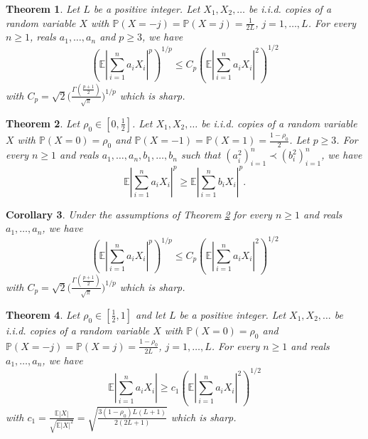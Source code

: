 \documentclass[10pt]{article}
\newcommand{\E}{\mathbb{E}}
\newcommand{\1}{\textbf{1}}
\newcommand{\p}[1]{\mathbb{P}\left( #1 \right)}
\newtheorem{theorem}{Theorem}
\newtheorem{corollary}[theorem]{Corollary}
\theoremstyle{remark}
\theoremstyle{definition}
\begin{document}
\begin{theorem}\label{thm:2-p>3}
Let $L$ be a positive integer. Let $X_1,X_2,\ldots$ be i.i.d. copies of a random variable $X$ with $\p{X = -j} = \p{X = j} = \frac{1}{2L}$, $j = 1, \ldots, L$. For every $n \geq 1$, reals $a_1,\ldots,a_n$ and $p \geq 3$, we have
\begin{equation}\label{eq:2-p>3}
\left(\E\left|\sum_{i=1}^n a_iX_i \right|^p\right)^{1/p} \leq C_p \left(\E\left|\sum_{i=1}^n a_iX_i \right|^2\right)^{1/2} 
\end{equation}
with $C_p = \sqrt{2} \Big(\frac{\Gamma (\frac{p+1}{2})}{\sqrt{\pi}} \Big)^{1/p}$ which is sharp.
\end{theorem}

\begin{theorem}\label{thm:Schur}
Let $\rho_0 \in [0,\frac{1}{2}]$. Let $X_1,X_2,\ldots$ be i.i.d. copies of a random variable $X$ with $\p{X = 0} = \rho_0$ and $\p{X = -1} = \p{X = 1} = \frac{1-\rho_0}{2}$. Let $p \geq 3$. For every $n \geq 1$ and reals $a_1,\ldots,a_n, b_1, \ldots, b_n$ such that $(a_i^2)_{i=1}^n \prec (b_i^2)_{i=1}^n$, we have
\begin{equation}\label{eq:Schur}
\E\left|\sum_{i=1}^n a_iX_i \right|^p \geq \E\left|\sum_{i=1}^n b_iX_i \right|^p.
\end{equation}
\end{theorem}

\begin{corollary}
Under the assumptions of Theorem \ref{thm:Schur} for every $n \geq 1$ and reals $a_1,\ldots,a_n$, we have
\begin{equation}\label{eq:2-p>3'}
\left(\E\left|\sum_{i=1}^n a_iX_i \right|^p\right)^{1/p} \leq C_p \left(\E\left|\sum_{i=1}^n a_iX_i \right|^2\right)^{1/2} 
\end{equation}
with $C_p = \sqrt{2} \Big(\frac{\Gamma (\frac{p+1}{2})}{\sqrt{\pi}} \Big)^{1/p}$ which is sharp.
\end{corollary}

\begin{theorem}\label{thm:L1-L2}
Let $\rho_0 \in [\frac{1}{2},1]$ and let $L$ be a positive integer. Let $X_1,X_2,\ldots$ be i.i.d. copies of a random variable $X$ with $\p{X = 0} = \rho_0$ and $\p{X = -j} = \p{X = j} = \frac{1-\rho_0}{2L}$, $j = 1, \ldots, L$. For every $n \geq 1$ and reals $a_1,\ldots,a_n$, we have
\begin{equation}\label{eq:L1-L2}
\E\left|\sum_{i=1}^n a_iX_i \right| \geq c_1\left(\E\left|\sum_{i=1}^n a_iX_i \right|^2\right)^{1/2} 
\end{equation}
with $c_1 = \frac{\E|X|}{\sqrt{\E|X|^2}} = \sqrt{\frac{3(1-\rho_0)L(L+1)}{2(2L+1)}}$ which is sharp.
\end{theorem}
\end{document}
